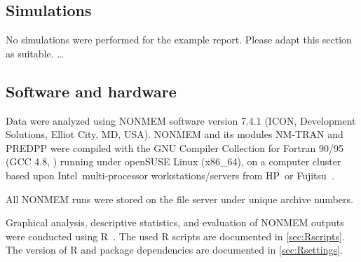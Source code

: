 \subsection{Simulations}

No simulations were performed for the example report. Please adapt this section as suitable. \ldots

\subsection{Software and hardware}
\label{sec:software}

Data were analyzed using \gls{NONMEM} software version 7.4.1 (ICON, Development Solutions, Elliot City, MD, USA). NONMEM and its modules \acrshort{NM-TRAN} and \acrshort{PREDPP} were compiled with the GNU Compiler Collection for Fortran 90/95 (GCC 4.8, \autocite{GNUCompilerCollection}) running under openSUSE Linux (x86\_64), on a computer cluster based upon Intel\textsuperscript\textregistered\ multi-processor workstations/servers from HP\textsuperscript\textregistered\ or Fujitsu\textsuperscript\textregistered\ \autocite{Speth2004}. 

All NONMEM runs were stored on the file server under unique archive numbers.

Graphical analysis, descriptive statistics, and evaluation of NONMEM outputs were conducted using R~\autocite{RTeam}. The used R scripts are documented in \cref{sec:Rscripts}. The version of R and package dependencies are documented in \cref{sec:Rsettings}.

  
